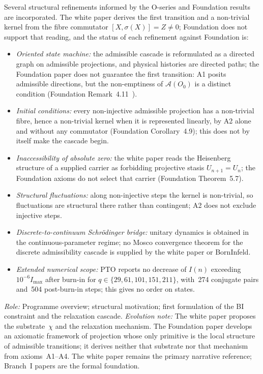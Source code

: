 \documentclass[11pt,a4paper]{article}
\begin{document}
    Several structural refinements informed by the O-series and Foundation results are incorporated.
    The white paper derives the first transition and a non-trivial kernel from the fibre commutator
    $[X,\sigma(X)] = Z \neq 0$; Foundation does not support that reading, and the status of each
    refinement against Foundation is:
    \begin{itemize}
      \item \textit{Oriented state machine:} the admissible cascade is reformulated as a directed
      graph on admissible projections, and physical histories are directed paths; the Foundation paper
      does not guarantee the first transition: A1 posits admissible directions, but the non-emptiness of
      $\mathcal{A}(O_0)$ is a distinct condition (Foundation Remark~4.11~\cite{Beau2026m}).
      \item \textit{Initial conditions:} every non-injective admissible projection has a non-trivial
      fibre, hence a non-trivial kernel when it is represented linearly, by A2 alone and without any
      commutator (Foundation Corollary~4.9); this does not by itself make the cascade begin.
      \item \textit{Inaccessibility of absolute zero:} the white paper reads the Heisenberg structure of a
      supplied carrier as forbidding projective stasis $U_{n+1} = U_n$; the Foundation axioms do not select
      that carrier (Foundation Theorem~5.7).
      \item \textit{Structural fluctuations:} along non-injective steps the kernel is non-trivial, so
      fluctuations are structural there rather than contingent; A2 does not exclude injective steps.
      \item \textit{Discrete-to-continuum Schr\"{o}dinger bridge:} unitary dynamics is obtained in the
      continuous-parameter regime; no Mosco convergence theorem for the discrete admissibility cascade
      is supplied by the white paper or BornInfeld.
      \item \textit{Extended numerical scope:} PTO reports no decrease of $I(n)$ exceeding
      $10^{-6}I_{\max}$ after burn-in for $q \in \{29,61,101,151,211\}$,
      with~274 conjugate pairs and~504 post-burn-in steps; this gives no order on states.
    \end{itemize}

    \textit{Role:} Programme overview; structural motivation; first formulation of the BI constraint
    and the relaxation cascade.
    \textit{Evolution note:} The white paper proposes the substrate~$\chi$ and the relaxation mechanism.
    The Foundation paper develops an axiomatic framework of projection whose only primitive is the local
    structure of admissible transitions; it derives neither that substrate nor that mechanism from
    axioms~A1--A4.
    The white paper remains the primary narrative reference; Branch~I papers are the formal foundation.
\end{document}
